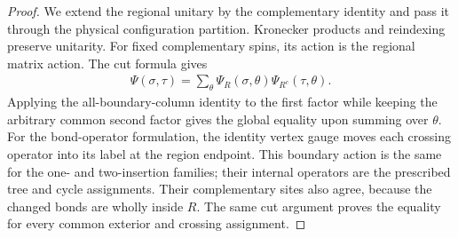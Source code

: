 \begin{proof}\leanok
    We extend the regional unitary by the complementary identity and pass
    it through the physical configuration partition. Kronecker products
    and reindexing preserve unitarity. For fixed complementary spins, its
    action is the regional matrix action.
    The cut formula gives
    \begin{align}
        \Psi(\sigma,\tau)
        =\sum_{\theta}\Psi_R(\sigma,\theta)
        \Psi_{R^c}(\tau,\theta).
    \end{align}
    Applying the all-boundary-column identity to the first factor while
    keeping the arbitrary common second factor gives the global equality upon
    summing over $\theta$.
    For the bond-operator formulation, the identity vertex gauge moves
    each crossing operator into its label at the region endpoint. This
    boundary action is the same for the one- and two-insertion families;
    their internal operators are the prescribed tree and cycle
    assignments. Their complementary sites also agree, because the changed
    bonds are wholly inside $R$. The same cut argument proves the equality
    for every common exterior and crossing assignment.
\end{proof}
